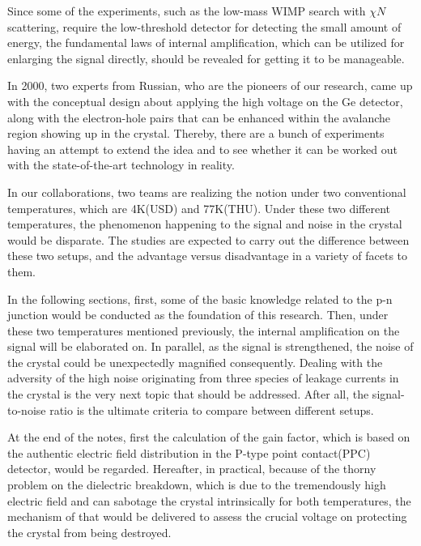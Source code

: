 \documentclass[%
 reprint,
 amsmath,amssymb,
 aps,
]{revtex4-2}
\begin{document}
Since some of the experiments, such as the low-mass WIMP search with $\chi N$ scattering, require the low-threshold detector for detecting the small amount of energy, the fundamental laws of internal amplification, which can be utilized for enlarging the signal directly, should be revealed for getting it to be manageable.\par
In 2000, two experts from Russian, who are the pioneers of our research, came up with the conceptual design about applying the high voltage on the Ge detector, along with the electron-hole pairs that can be enhanced within the avalanche region showing up in the crystal. Thereby, there are a bunch of experiments having an attempt to extend the idea and to see whether it can be worked out with the state-of-the-art technology in reality.\par
In our collaborations, two teams are realizing the notion under two conventional temperatures, which are 4K(USD) and 77K(THU). Under these two different temperatures, the phenomenon happening to the signal and noise in the crystal would be disparate. The studies are expected to carry out the difference between these two setups, and the advantage versus disadvantage in a variety of facets to them.\par
In the following sections, first, some of the basic knowledge related to the p-n junction would be conducted as the foundation of this research. Then, under these two temperatures mentioned previously, the internal amplification on the signal will be elaborated on. In parallel, as the signal is strengthened, the noise of the crystal could be unexpectedly magnified consequently. Dealing with the adversity of the high noise originating from three species of leakage currents in the crystal is the very next topic that should be addressed. After all, the signal-to-noise ratio is the ultimate criteria to compare between different setups.\par
At the end of the notes, first the calculation of the gain factor, which is based on the authentic electric field distribution in the P-type point contact(PPC) detector, would be regarded. Hereafter, in practical, because of the thorny problem on the dielectric breakdown, which is due to the tremendously high electric field and can sabotage the crystal intrinsically for both temperatures, the mechanism of that would be delivered to assess the crucial voltage on protecting the crystal from being destroyed. 

\end{document}
